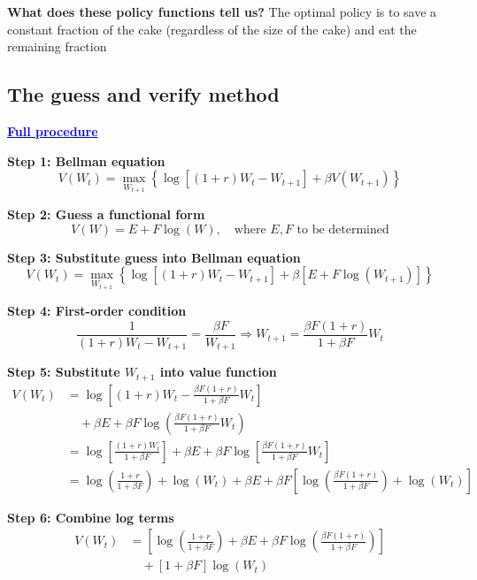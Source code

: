 \documentclass[12pt]{article}
\begin{document}
\textbf{What does these policy functions tell us?}
The optimal policy is to save a constant fraction of the cake (regardless of the size of the cake) and eat the remaining fraction

\subsection*{\noindent\textbf{The guess and verify method}}

\textcolor{blue}{\textbf{\uline{Full procedure}}}

{\color{blue}

\textbf{Step 1: Bellman equation}
\[
V(W_t) = \max_{W_{t+1}} \left\{ \log\left[(1 + r)W_t - W_{t+1} \right] + \beta V(W_{t+1}) \right\}
\]

\textbf{Step 2: Guess a functional form}
\[
V(W) = E + F \log(W), \quad \text{where } E, F \text{ to be determined}
\]

\textbf{Step 3: Substitute guess into Bellman equation}
\[
V(W_t) = \max_{W_{t+1}} \left\{ \log\left[(1 + r)W_t - W_{t+1} \right] + \beta \left[E + F \log(W_{t+1}) \right] \right\}
\]

\textbf{Step 4: First-order condition}
\[
\frac{1}{(1 + r)W_t - W_{t+1}} = \frac{\beta F}{W_{t+1}}
\Rightarrow W_{t+1} = \frac{\beta F(1 + r)}{1 + \beta F} W_t
\]

\textbf{Step 5: Substitute $W_{t+1}$ into value function}
\begin{align*}
V(W_t) &= \log\left[ (1 + r)W_t - \frac{\beta F(1 + r)}{1 + \beta F} W_t \right] \\
&\quad + \beta E + \beta F \log\left( \frac{\beta F(1 + r)}{1 + \beta F} W_t \right) \\
&= \log\left[ \frac{(1 + r)W_t}{1 + \beta F} \right]
+ \beta E + \beta F \log\left[ \frac{\beta F(1 + r)}{1 + \beta F} W_t \right] \\
&= \log\left( \frac{1 + r}{1 + \beta F} \right)
+ \log(W_t)
+ \beta E
+ \beta F \left[ \log\left( \frac{\beta F(1 + r)}{1 + \beta F} \right) + \log(W_t) \right]
\end{align*}

\textbf{Step 6: Combine log terms}
\begin{align*}
V(W_t) &= \left[ \log\left( \frac{1 + r}{1 + \beta F} \right)
+ \beta E + \beta F \log\left( \frac{\beta F(1 + r)}{1 + \beta F} \right) \right] \\
&\quad + \left[ 1 + \beta F \right] \log(W_t)
\end{align*}

}
\end{document}

